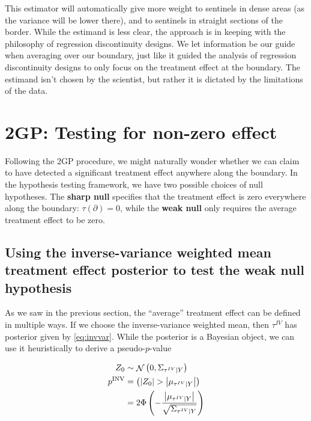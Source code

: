\documentclass[letter]{article}
\newcommand{\genericdel}[3]{%
      \left#1#3\right#2
    }
\newcommand{\del}[1]{\genericdel(){#1}}
\let\Pr\relax
\DeclareMathOperator{\Pr}{\mathbb{P}}
\DeclareMathOperator{\normal}{\mathcal{N}}
\newcommand{\abs}[1]{\genericdel||{#1}}
\newcommand{\boundary}{\partial}
\newcommand{\invvar}{\tau^{IV}}
\begin{document}
This estimator will automatically give more weight to sentinels in dense
areas (as the variance will be lower there), and to sentinels in
straight sections of the border. While the estimand is less clear, the
approach is in keeping with the philosophy of regression discontinuity
designs. We let information be our guide when averaging over our
boundary, just like it guided the analysis of regression discontinuity
designs to only focus on the treatment effect at the boundary. The
estimand isn't chosen by the scientist, but rather it is dictated by the
limitations of the data.
    


    	\section{2GP: Testing for non-zero
effect}\label{gp-testing-for-non-zero-effect}

Following the 2GP procedure, we might naturally wonder whether we can
claim to have detected a significant treatment effect anywhere along the
boundary. In the hypothesis testing framework, we have two possible
choices of null hypotheses. The \textbf{sharp null} specifies that the
treatment effect is zero everywhere along the boundary:
\(\tau(\boundary)=0\), while the \textbf{weak null} only requires the
average treatment effect to be zero.

\subsection{Using the inverse-variance weighted mean treatment effect
posterior to test the weak null
hypothesis}\label{using-the-inverse-variance-weighted-mean-treatment-effect-posterior-to-test-the-weak-null-hypothesis}

As we saw in the previous section, the ``average'' treatment effect can
be defined in multiple ways. If we choose the inverse-variance weighted
mean, then \(\invvar\) has posterior given by \eqref{eq:invvar}. While
the posterior is a Bayesian object, we can use it heuristically to
derive a pseudo-\(p\)-value

\begin{equation}
\begin{split}
    Z_0 &\sim \normal\del{0, \Sigma_{\invvar \mid Y}}  \\
    p^{\mathrm{INV}} &= \Pr\del{ 
        \abs{Z_0} > 
        \abs{
            \mu_{
                \invvar \mid Y
            }
        } 
    } \\
    &= 2\Phi\del{-
        \frac{
            \abs{
                \mu_{
                    \invvar \mid Y
                }
            }
        }{
            \sqrt{
                \Sigma_{\invvar \mid Y}
            }
        }
    }
\end{split}
\end{equation}
\end{document}
